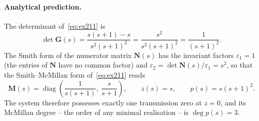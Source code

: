 \paragraph{Analytical prediction.} The determinant of~\eqref{eq:ex211} is
\begin{equation}
    \det\mathbf{G}(s) = \frac{s(s+1)-s}{s^2(s+1)^2} = \frac{s^2}{s^2(s+1)^2}
    = \frac{1}{(s+1)^2}.
    \label{eq:detG211}
\end{equation}
The Smith form of the numerator matrix $\mathbf{N}(s)$ has the invariant factors
$\varepsilon_1=1$ (the entries of $\mathbf{N}$ have no common factor) and
$\varepsilon_2=\det\mathbf{N}(s)/\varepsilon_1 = s^2$, so that the Smith--McMillan form
of~\eqref{eq:ex211} reads
\begin{equation}
    \mathbf{M}(s) = \operatorname{diag}\!\left(\frac{1}{s(s+1)},\ \frac{s}{s+1}\right),
    \qquad
    z(s) = s, \qquad p(s) = s(s+1)^2 .
    \label{eq:sm211}
\end{equation}
The system therefore possesses exactly one transmission zero at $z=0$, and its McMillan degree
-- the order of any minimal realisation -- is $\deg p(s) = 3$.

